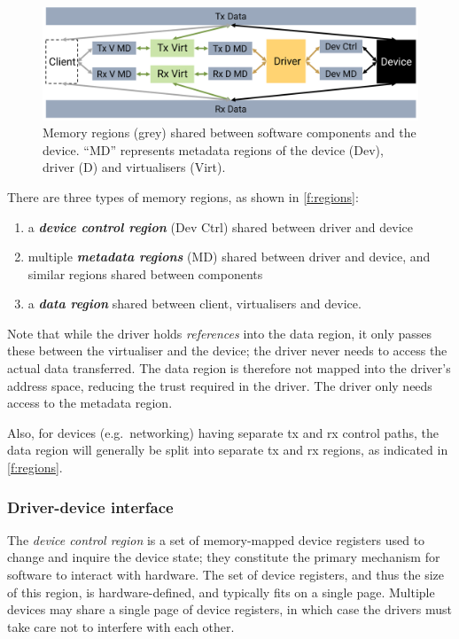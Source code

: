 \documentclass[a4paper,12pt]{report}
\newcommand{\Obj}[1]{\textsl{#1}}
\newcommand{\figscale}{0.2}
\begin{document}
\begin{figure}[th]
  \centering
  \includegraphics[scale=\figscale]{regions}
  \caption[Memory regions shared between software components
    and the device.]{Memory regions (grey) shared between software components
    and the device. ``MD'' represents metadata regions of the device
    (Dev), driver (D) and virtualisers (Virt).}
  \label{f:regions}
\end{figure}

There are three types of memory
regions, as shown in \autoref{f:regions}:
\begin{enumerate}
\item a \textbf{\Obj{device control region}} (Dev Ctrl) shared between driver and device
\item multiple \textbf{\Obj{metadata regions}} (MD) shared between driver and
  device, and similar regions shared between components
\item a \textbf{\Obj{data region}} shared between client, virtualisers and device.
\end{enumerate}

Note that while the driver holds \emph{references} into the data region, it
only passes these between the virtualiser and the device; the driver never needs to
access the actual data transferred. The data region is therefore not
mapped into the driver's address space, reducing the trust required in
the driver. The driver only needs access to the metadata region.

Also, for devices (e.g.\ networking) having separate \gls{tx} and \gls{rx} control paths, the data
region will generally be split into separate \gls{tx} and \gls{rx} regions, as
indicated in \autoref{f:regions}.

\subsubsection{Driver-device interface}

The \emph{device control region} is a set of memory-mapped device
registers used to change and inquire the device state; they constitute
the primary mechanism for software to interact with hardware. The set
of device registers, and thus the size of this region, is
hardware-defined, and typically fits on a single page. Multiple
devices may share a single page of device registers, in which case the
drivers must take care not to interfere with each other.
\end{document}
